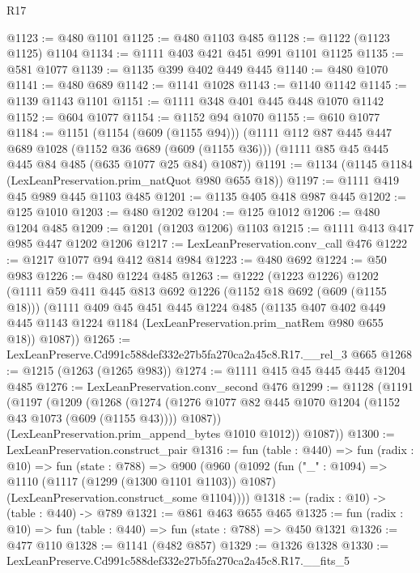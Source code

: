\begin{lexlean}{R17}
\begin{coremodule}
@1123 := @480 @1101
@1125 := @480 @1103 @485
@1128 := @1122 (@1123 @1125) @1104
@1134 := @1111 @403 @421 @451 @991 @1101 @1125
@1135 := @581 @1077
@1139 := @1135 @399 @402 @449 @445
@1140 := @480 @1070
@1141 := @480 @689
@1142 := @1141 @1028
@1143 := @1140 @1142
@1145 := @1139 @1143 @1101
@1151 := @1111 @348 @401 @445 @448 @1070 @1142
@1152 := @604 @1077
@1154 := @1152 @94 @1070
@1155 := @610 @1077
@1184 := @1151
    (@1154 (@609 (@1155 @94)))
    (@1111
      @112
      @87
      @445
      @447
      @689
      @1028
      (@1152 @36 @689 (@609 (@1155 @36)))
      (@1111 @85 @45 @445 @445 @84 @485 (@635 @1077 @25 @84) @1087))
@1191 := @1134 (@1145 @1184 (LexLeanPreservation.prim_natQuot @980 @655 @18))
@1197 := @1111 @419 @45 @989 @445 @1103 @485
@1201 := @1135 @405 @418 @987 @445
@1202 := @125 @1010
@1203 := @480 @1202
@1204 := @125 @1012
@1206 := @480 @1204 @485
@1209 := @1201 (@1203 @1206) @1103
@1215 := @1111 @413 @417 @985 @447 @1202 @1206
@1217 := LexLeanPreservation.conv_call @476
@1222 := @1217 @1077 @94 @412 @814 @984
@1223 := @480 @692
@1224 := @50 @983
@1226 := @480 @1224 @485
@1263 := @1222
    (@1223 @1226)
    @1202
    (@1111
      @59
      @411
      @445
      @813
      @692
      @1226
      (@1152 @18 @692 (@609 (@1155 @18)))
      (@1111
        @409
        @45
        @451
        @445
        @1224
        @485
        (@1135
          @407
          @402
          @449
          @445
          @1143
          @1224
          @1184
          (LexLeanPreservation.prim_natRem @980 @655 @18))
        @1087))
@1265 := LexLeanPreserve.Cd991c588def332e27b5fa270ca2a45c8.R17.__rel_3 @665
@1268 := @1215 (@1263 (@1265 @983))
@1274 := @1111 @415 @45 @445 @445 @1204 @485
@1276 := LexLeanPreservation.conv_second @476
@1299 := @1128
    (@1191
      (@1197
        (@1209
          (@1268
            (@1274 (@1276 @1077 @82 @445 @1070 @1204 (@1152 @43 @1073 (@609 (@1155 @43)))) @1087))
          (LexLeanPreservation.prim_append_bytes @1010 @1012))
        @1087))
@1300 := LexLeanPreservation.construct_pair
@1316 := fun (table : @440) =>
  fun (radix : @10) =>
  fun (state : @788) =>
  @900
    (@960
      (@1092
        (fun ("_" : @1094) =>
        @1110
          (@1117 (@1299 (@1300 @1101 @1103)) @1087)
          (LexLeanPreservation.construct_some @1104))))
@1318 := (radix : @10) -> (table : @440) -> @789
@1321 := @861 @463 @655 @465
@1325 := fun (radix : @10) => fun (table : @440) => fun (state : @788) => @450 @1321
@1326 := @477 @110
@1328 := @1141 (@482 @857)
@1329 := @1326 @1328
@1330 := LexLeanPreserve.Cd991c588def332e27b5fa270ca2a45c8.R17.__fits_5

\end{coremodule}
\end{lexlean}
